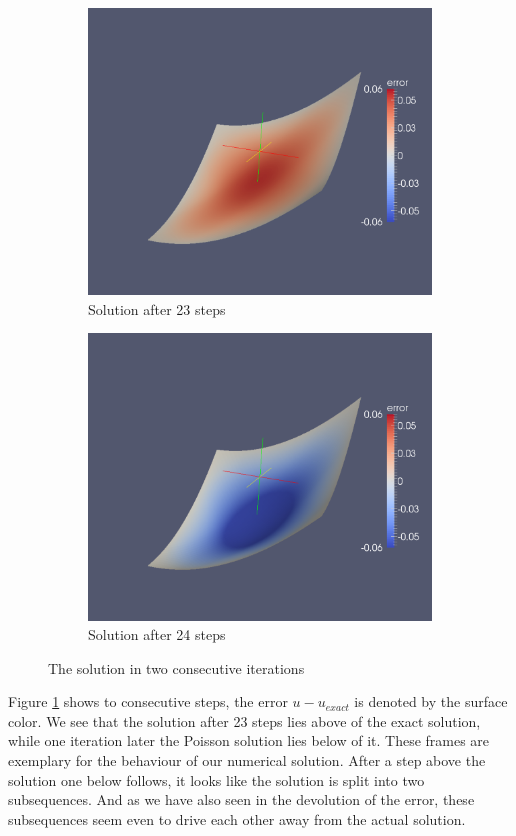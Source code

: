 \begin{figure}[!h]
\begin{subfigure}[b]{.5\textwidth}
	\includegraphics[width=1.\textwidth]{plots/with_penalty_it22.pdf}
	\caption{Solution after 23 steps}
\end{subfigure}
\begin{subfigure}[b]{.5\textwidth}
	\includegraphics[width=1.\textwidth]{plots/with_penalty_it23.pdf}
	\caption{Solution after 24 steps}
\end{subfigure}
\caption{The solution in two consecutive iterations}
\label{fig: diff iteration}
\end{figure}
Figure \ref{fig: diff iteration} shows to consecutive steps, the error $u-u_{exact}$ is denoted by the surface color. We see that the solution after 23 steps lies above of the exact solution, while one iteration later the Poisson solution lies below of it. These frames are exemplary for the behaviour of our numerical solution. After a step above the solution one below follows, it looks like the solution is split into two subsequences.  And as we have also seen in the devolution of the error, these subsequences seem even to drive each other away from the actual solution.

